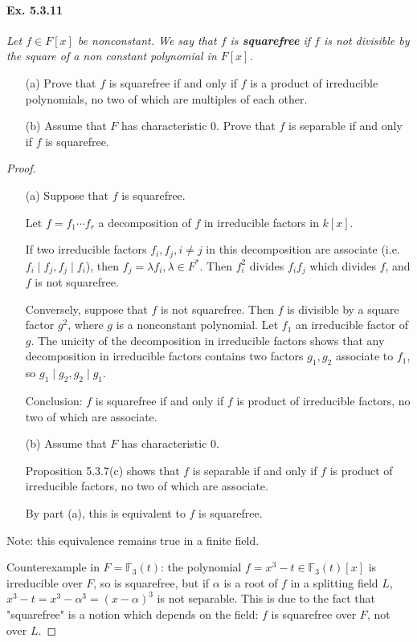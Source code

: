 \documentclass[11pt,a4paper]{article}
\newcommand{\F}{\mathbb{F}}
\begin{document}
\paragraph{Ex. 5.3.11}

{\it Let $f \in F[x]$ be nonconstant. We say that $f$ is {\bf squarefree} if $f$ is not divisible by the square of a non constant polynomial in $F[x]$.
\begin{enumerate}
\item[(a)] Prove that $f$ is squarefree if and only if $f$ is a product of irreducible polynomials, no two of which are multiples of each other.
\item[(b)] Assume that $F$ has characteristic $0$. Prove that $f$ is separable if and only if $f$ is squarefree.
\end{enumerate}
}

\begin{proof}
\begin{enumerate}
\item[(a)]
Suppose that $f$ is squarefree.

Let $f = f_1\cdots f_r$ a decomposition of $f$ in irreducible factors in $k[x]$.

If two irreducible factors $f_i,f_j, i\neq j$ in this decomposition are associate (i.e. $f_i \mid f_j, f_j \mid f_i$), then $f_j = \lambda f_i, \lambda \in F^*$. Then $f_i^2$ divides $f_if_j$ which divides $f$, and $f$ is not squarefree. 

Conversely, suppose that $f$ is not squarefree. Then $f$ is divisible by a square factor $g^2$, where $g$ is a nonconstant polynomial. Let $f_1$ an irreducible factor of $g$. The unicity of the decomposition in irreducible factors shows that any decomposition in irreducible factors contains two factors $g_1,g_2$ associate to $f_1$, so $g_1 \mid g_2, g_2 \mid g_1$.

Conclusion: $f$ is squarefree if and only if $f$ is product of irreducible factors, no two of which are associate.

\item[(b)]
Assume that $F$ has characteristic $0$.

Proposition 5.3.7(c) shows that $f$ is separable if and only if $f$ is product of irreducible factors, no two of which are associate.

By part (a), this is equivalent to $f$ is squarefree.

\end{enumerate}

\bigskip

Note: this equivalence remains true in a finite field. 

Counterexample in $F = \F_3(t)$: the polynomial $f= x^3 - t \in \F_3(t)[x]$ is irreducible over $F$, so is squarefree, but if $\alpha$ is a root of $f$ in a splitting field $L$, $x^3 - t = x^3- \alpha^3  = (x-\alpha)^3$ is not separable. This is due to the fact that  "squarefree" is a notion which depends on the field: $f$ is squarefree over $F$, not over $L$.
\end{proof}
\end{document}
